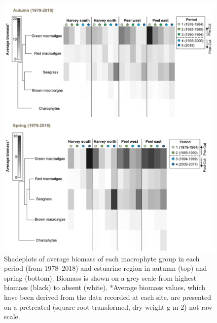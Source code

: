 \documentclass[
]{book}
\begin{document}
\begin{figure}
\includegraphics[width=1\linewidth]{images/macrophytes/picture7} \caption{Shadeplots of average biomass of each macrophyte group in each period (from 1978–2018) and estuarine region in autumn (top) and spring (bottom). Biomass is shown on a grey scale from highest biomass (black) to absent (white). *Average biomass values, which have been derived from the data recorded at each site, are presented on a pretreated (square-root transformed, dry weight g m-2) not raw scale.}\label{fig:macrophytes-pic7}
\end{figure}
\end{document}
